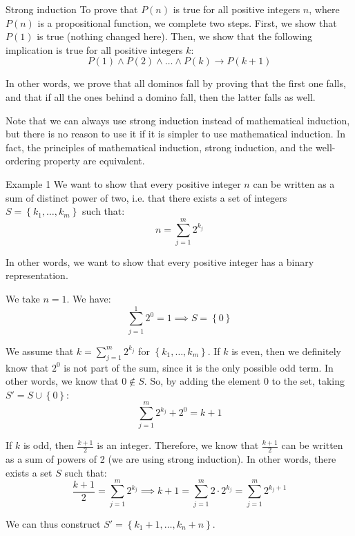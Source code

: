 \documentclass[a4paper]{article}
\begin{document}
\begin{parag}{Strong induction}
    To prove that $P\left(n\right)$ is true for all positive integers $n$, where $P\left(n\right)$ is a propositional function, we complete two steps. First, we show that $P\left(1\right)$ is true (nothing changed here). Then, we show that the following implication is true for all positive integers $k$:
    \[P\left(1\right) \land P\left(2\right) \land \ldots \land P\left(k\right) \to P\left(k+1\right)\]

    In other words, we prove that all dominos fall by proving that the first one falls, and that if all the ones behind a domino fall, then the latter falls as well.

    Note that we can always use strong induction instead of mathematical induction, but there is no reason to use it if it is simpler to use mathematical induction. In fact, the principles of mathematical induction, strong induction, and the well-ordering property are equivalent.
\end{parag}

\begin{parag}{Example 1}
    We want to show that every positive integer $n$ can be written as a sum of distinct power of two, i.e. that there exists a set of integers $S = \left\{k_1, \ldots, k_m\right\}$ such that:
    \[n = \sum_{j=1}^{m} 2^{k_{j}}\]

    In other words, we want to show that every positive integer has a binary representation.

     We take $n = 1$. We have:
    \[\sum_{j = 1}^{1} 2^0 = 1 \implies S = \left\{0\right\}\]

     We assume that $k = \sum_{j=1}^{m} 2^{k_{j}}$ for $\left\{k_1, \ldots, k_m\right\}$. If $k$ is even, then we definitely know that $2^0$ is not part of the sum, since it is the only possible odd term. In other words, we know that $0 \not\in S$. So, by adding the element $0$ to the set, taking $S' = S \cup \left\{0\right\}$:
    \[\sum_{j=1}^{m} 2^{k_{j}} + 2^0 = k + 1\]

    If $k$ is odd, then $\frac{k+1}{2}$ is an integer. Therefore, we know that $\frac{k+1}{2}$ can be written as a sum of powers of 2 (we are using strong induction). In other words, there exists a set $S$ such that:
    \[\frac{k+1}{2} = \sum_{j=1}^{m} 2^{k_{j}} \implies k+1 = \sum_{j=1}^{m} 2\cdot 2^{k_{j}} = \sum_{j=1}^{m} 2^{k_j + 1}\]

    We can thus construct $S' = \left\{k_1 + 1, \ldots, k_n + n\right\}$.
\end{parag}
\end{document}

